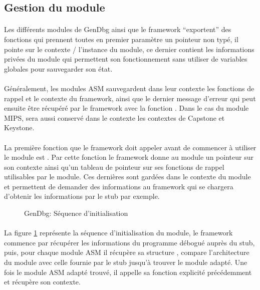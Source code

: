 \documentclass[11pt, book, english, french, standardlists]{upmethodology-document}
\begin{document}
			\subsection{Gestion du module}
				\paragraph*{}
					Les différents modules de GenDbg ainsi que le framework ``exportent'' des fonctions qui prennent toutes en premier paramètre un pointeur non typé, il pointe sur le contexte / l'instance du module, ce dernier contient les informations privées du module qui permettent son fonctionnement sans utiliser de variables globales pour sauvegarder son état.
				\paragraph*{}
					Généralement, les modules ASM sauvegardent dans leur contexte les fonctions de rappel et le contexte du framework, ainsi que le dernier message d'erreur qui peut ensuite être récupéré par le framework avec la fonction . Dans le cas du module \gls{MIPS}, sera aussi conservé dans le contexte les contextes de Capstone et Keystone.
				\paragraph*{}
					La première fonction que le framework doit appeler avant de commencer à utiliser le module est . Par cette fonction le framework donne au module un pointeur sur son contexte ainsi qu'un tableau de pointeur sur ses fonctions de rappel utilisables par le module. Ces dernières sont gardées dans le contexte du module et permettent de demander des informations au framework qui se chargera d'obtenir les informations par le stub par exemple.
				\begin{figure}[H]
					\centering
					\caption{GenDbg: Séquence d'initialisation}
					\label{fig:GenDbg_diagramme_sequence_initialisation}
					\vspace{-0.5cm}
				\end{figure}
				\paragraph*{}
					La figure \ref{fig:GenDbg_diagramme_sequence_initialisation} représente la séquence d'initialisation du module, le framework commence par récupérer les informations du programme débogué auprès du stub, puis, pour chaque module ASM il récupère sa structure , compare l'architecture du module avec celle fournie par le stub jusqu'à trouver le module adapté. Une fois le module ASM adapté trouvé, il appelle sa fonction  explicité précédemment et récupère son contexte.
\end{document}
